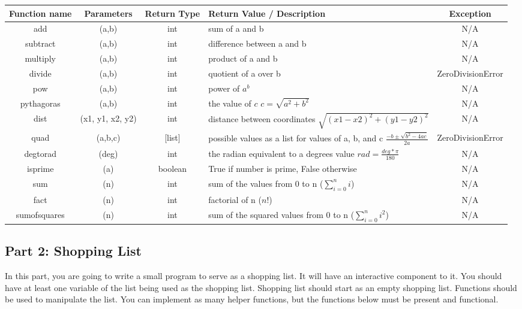\documentclass[12pt]{report}
\begin{document}
\begin{tabular}{| c | c | c | M | c |}
    \hline
    Function name & Parameters & Return Type & Return Value / Description & Exception\\
    \hline
    add & (a,b) & int & sum of a and b & N/A \\
    \hline
    subtract & (a,b) & int & difference between a and b & N/A \\
    \hline
    multiply & (a,b) & int & product of a and b & N/A \\
    \hline
    divide & (a,b) & int & quotient of a over b & ZeroDivisionError \\
    \hline
    pow & (a,b) & int & power of ${a^b}$ & N/A \\
    \hline
    pythagoras & (a,b) & int & the value of ${c}$ \newline ${c = \sqrt{a^2 + b^2}}$ & N/A \\
    \hline
    dist & (x1, y1, x2, y2) & int & distance between coordinates \newline $\sqrt{(x1 - x2)^2 + (y1 - y2)^2}$ & N/A \\
    \hline
    quad & (a,b,c) & [list] & possible values as a list for values of a, b, and c \newline $\frac{-b\pm\sqrt{b^2-4ac}}{2a}$& ZeroDivisionError \\
    \hline
    degtorad & (deg) & int & the radian equivalent to a degrees value \newline ${rad = \frac{deg * \pi}{180}}$ & N/A\\
    \hline
    isprime & (a) & boolean & True if number is prime, False otherwise & N/A \\
    \hline
    sum & (n) & int & sum of the values from 0 to n \newline (${\sum_{i = 0}^{n}{i}}$) & N/A \\
    \hline
    fact & (n) & int & factorial of n (${n!}$) & N/A \\
    \hline
    sumofsquares & (n) & int & sum of the squared values from 0 to n \newline (${\sum_{i = 0}^{n}{i^2}}$) & N/A\\
    \hline
\end{tabular}


\newpage
\subsection*{Part 2: Shopping List}

In this part, you are going to write a small program to serve as a shopping list. 
It will have an interactive component to it. You should have at least one variable of the list being used as the shopping list.
Shopping list should start as an empty shopping list. Functions should be used to manipulate the list. You can implement as many helper functions, but the functions below must be present and functional.
\end{document}
